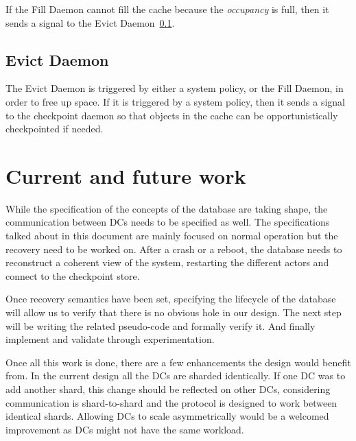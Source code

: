 \documentclass[twoside]{article}
\begin{document}

If the Fill Daemon cannot fill the cache because the \emph{occupancy}
is full, then it sends a signal to the Evict Daemon~\ref{sec:evict-daemon}.

\subsection{Evict Daemon}
\label{sec:evict-daemon}
 
The Evict Daemon is triggered by either a system policy, or the Fill Daemon, in 
order to free up space. 
If it is triggered by a system policy, then it sends a signal to the 
checkpoint daemon so that objects in the cache can be opportunistically
checkpointed if needed.



\section{Current and future work}
\label{sec:current-future}

While the specification of the concepts of the database are taking shape, the
communication between DCs needs to be specified as well.
The specifications talked about in this document are mainly focused on normal
operation but the recovery need to be worked on. 
After a crash or a reboot, the database needs to reconstruct a coherent view of
the system, restarting the different actors and connect to the checkpoint store.

Once recovery semantics have been set, specifying the lifecycle of the
database will allow us to verify that there is no obvious hole in our design.
The next step will be writing the related pseudo-code and formally verify
it. 
And finally implement and validate through experimentation.

Once all this work is done, there are a few enhancements the design would benefit
from.
In the current design all the DCs are sharded identically. 
If one DC was to add another shard, this change should be reflected on other DCs,
considering communication is shard-to-shard and the protocol is designed to
work between identical shards.
Allowing DCs to scale asymmetrically would be a welcomed improvement as DCs
might not have the same workload.
\end{document}

